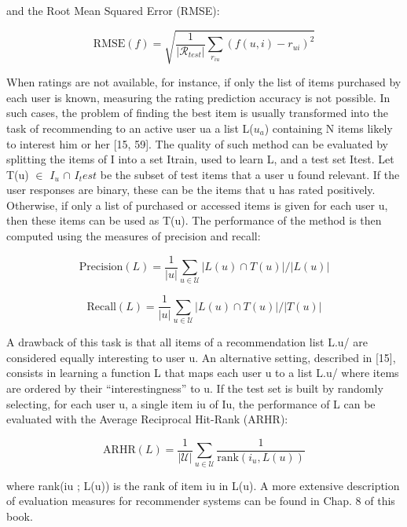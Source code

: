 and the Root Mean Squared Error (RMSE):

$$
\mathrm { RMSE } ( f ) = \sqrt { \frac { 1 } { \left| \mathcal { R } _ { test} \right| } \sum _ { r _ { i u } } \left( f ( u , i ) - r _ { u i } \right) ^ { 2 } }
$$

When ratings are not available, for instance, if only the list of items purchased by each user is known, measuring the rating prediction accuracy is not possible. In such cases, the problem of finding the best item is usually transformed into the task of recommending to an active user ua a list L($u_a$) containing N items likely to interest him or her [15, 59]. The quality of such method can be evaluated by splitting the items of I into a set Itrain, used to learn L, and a test set Itest. Let  T(u) $\in$ $I_u$ $\cap$ $I_test$ be the subset of test items that a user u found relevant. If the user responses are binary, these can be the items that u has rated positively. Otherwise, if only a list of purchased or accessed items is given for each user u, then these items can be used as T(u). The performance of the method is then computed using the measures of precision and recall:

$$
\mathrm { Precision } ( L ) = \frac { 1 } { | u | } \sum _ { u \in \mathcal { U } } | L ( u ) \cap T ( u ) | / | L ( u ) |
$$


$$
\mathrm { Recall } ( L ) = \frac { 1 } { | u | } \sum _ { u \in \mathcal { U } } | L ( u ) \cap T ( u ) | / | T ( u ) |
$$

A drawback of this task is that all items of a recommendation list L.u/ are considered equally interesting to user u. An alternative setting, described in [15], consists in learning a function L that maps each user u to a list L.u/ where items are ordered by their “interestingness” to u. If the test set is built by randomly selecting, for each user u, a single item iu of Iu, the performance of L can be evaluated with the Average Reciprocal Hit-Rank (ARHR):

$$
\mathrm { ARHR } ( L ) = \frac { 1 } { | \mathcal { U } | } \sum _ { u \in \mathcal { U } } \frac { 1 } { \mathrm { rank } \left( i _ { u } , L ( u ) \right) }
$$

where rank(iu ; L(u)) is the rank of item iu in L(u). A more extensive description of evaluation measures for recommender systems can be found in Chap. 8 of this book.

